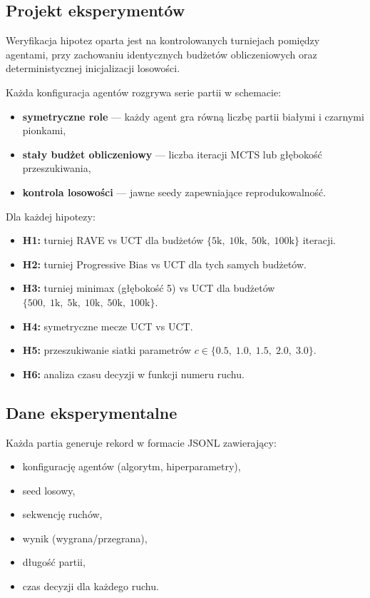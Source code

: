 \documentclass[12pt,a4paper]{article}
\begin{document}
\subsection{Projekt eksperymentów}

Weryfikacja hipotez oparta jest na kontrolowanych turniejach pomiędzy agentami, przy zachowaniu identycznych budżetów obliczeniowych oraz deterministycznej inicjalizacji losowości.

Każda konfiguracja agentów rozgrywa serie partii w schemacie:
\begin{itemize}[leftmargin=2em]
  \item \textbf{symetryczne role} --- każdy agent gra równą liczbę partii białymi i czarnymi pionkami,
  \item \textbf{stały budżet obliczeniowy} --- liczba iteracji MCTS lub głębokość przeszukiwania,
  \item \textbf{kontrola losowości} --- jawne seedy zapewniające reprodukowalność.
\end{itemize}

Dla każdej hipotezy:

\begin{itemize}[leftmargin=2em]
  \item \textbf{H1:} turniej RAVE vs UCT dla budżetów $\{5\text{k},\; 10\text{k},\; 50\text{k},\; 100\text{k}\}$ iteracji.
  \item \textbf{H2:} turniej Progressive Bias vs UCT dla tych samych budżetów.
  \item \textbf{H3:} turniej minimax (głębokość 5) vs UCT dla budżetów $\{500,\; 1\text{k},\; 5\text{k},\; 10\text{k},\; 50\text{k},\; 100\text{k}\}$.
  \item \textbf{H4:} symetryczne mecze UCT vs UCT.
  \item \textbf{H5:} przeszukiwanie siatki parametrów $c \in \{0.5,\; 1.0,\; 1.5,\; 2.0,\; 3.0\}$.
  \item \textbf{H6:} analiza czasu decyzji w funkcji numeru ruchu.
\end{itemize}

\subsection{Dane eksperymentalne}

Każda partia generuje rekord w formacie JSONL zawierający:
\begin{itemize}[leftmargin=2em]
  \item konfigurację agentów (algorytm, hiperparametry),
  \item seed losowy,
  \item sekwencję ruchów,
  \item wynik (wygrana/przegrana),
  \item długość partii,
  \item czas decyzji dla każdego ruchu.
\end{itemize}
\end{document}
